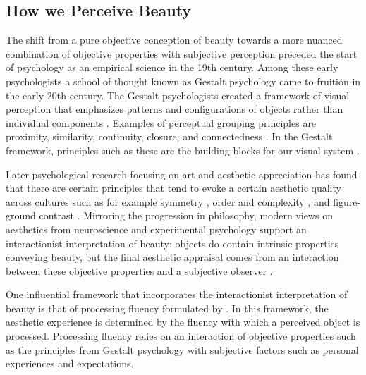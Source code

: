 \documentclass[../main.tex]{subfiles}
\begin{document}
\subsection{How we Perceive Beauty}
The shift from a pure objective conception of beauty towards a more nuanced combination of objective properties with subjective perception preceded the start of psychology as an empirical science in the 19th century. Among these early psychologists a school of thought known as Gestalt psychology came to fruition in the early 20th century. The Gestalt psychologists created a framework of visual perception that emphasizes patterns and configurations of objects rather than individual components \parencite{wagemansCenturyGestaltPsychology2012a}. Examples of perceptual grouping principles are proximity, similarity, continuity, closure, and connectedness \parencite{goldstein2009perceiving}. In the Gestalt framework, principles such as these are the building blocks for our visual system \parencite{wagemansCenturyGestaltPsychology2012a}.

Later psychological research focusing on art and aesthetic appreciation has found that there are  certain principles that tend to evoke a certain aesthetic quality across cultures such as for example symmetry \parencite{bodeCrossculturalComparisonPreference2017}, order and complexity \parencite{van2021order}, and figure-ground contrast \parencite{reberProcessingFluencyAesthetic2004}. Mirroring the progression in philosophy, modern views on aesthetics from neuroscience and experimental psychology support an interactionist interpretation of beauty: objects do contain intrinsic properties conveying beauty, but the final aesthetic appraisal comes from an interaction between these objective properties and a subjective observer \parencite{valenziseAdvancesChallengesComputational2022}.

One influential framework that incorporates the interactionist interpretation of beauty is that of processing fluency formulated by \textcite{reberProcessingFluencyAesthetic2004}. In this framework, the aesthetic experience is determined by the fluency with which a perceived object is processed. Processing fluency relies on an interaction of objective properties such as the principles from Gestalt psychology with subjective factors such as personal experiences and expectations.

\end{document}
